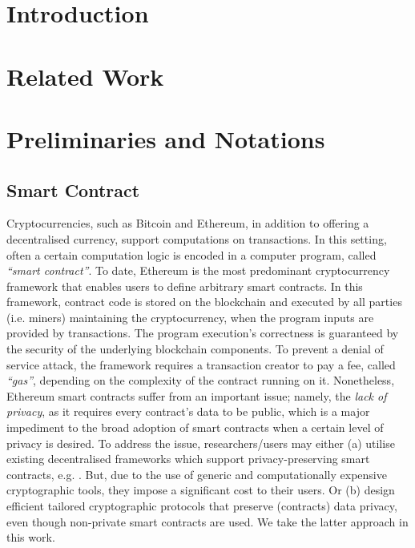 


\section{Introduction}

\section{Related Work}\label{Related-Work}

\section{Preliminaries and Notations} \label{preliminaries}




\subsection{Smart Contract} Cryptocurrencies, such as Bitcoin and Ethereum, in addition to offering a decentralised currency,  support  computations on  transactions. In this setting, often a certain computation logic is encoded in a computer program, called \emph{``smart contract''}. To date, Ethereum is the most predominant cryptocurrency framework that enables users to define arbitrary smart contracts. In this framework,  contract code is stored on the blockchain and  executed by all parties (i.e. miners) maintaining the cryptocurrency,  when the program inputs are provided by transactions. The program execution's  correctness  is  guaranteed by the security of the underlying blockchain components. To prevent  a denial of service attack, the framework requires a transaction creator to pay a  fee, called \emph{``gas''}, depending on the complexity of the contract running on  it.  Nonetheless,  Ethereum smart contracts suffer from an important   issue; namely, the \emph{lack of privacy}, as it requires  every contract's data to be public, which is a major impediment  to  the broad adoption of  smart contracts when a certain level of privacy is desired. To address the issue, researchers/users may either (a)  utilise existing decentralised frameworks  which support privacy-preserving smart contracts, e.g. \cite{KosbaMSWP16}. But, due to the use of generic and computationally expensive cryptographic tools,  they impose a significant cost to their users. Or (b)  design  efficient tailored cryptographic protocols  that preserve (contracts) data privacy, even though non-private smart contracts are used. We take the latter approach in this work. 




